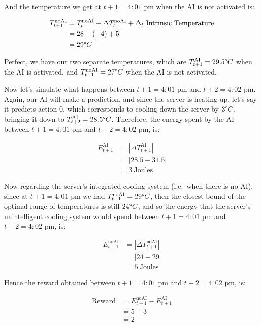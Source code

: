 \documentclass[]{book}
\begin{document}
And the temperature we get at \(t+1 = 4:01\) pm when the AI is not activated is:

\begin{align*}
    T_{t+1}^{\textrm{noAI}}
    & = T_t^{\textrm{noAI}} + \Delta T_t^{\textrm{noAI}} + \Delta_t \ \textrm{Intrinsic Temperature} \\
    & = 28 + (-4) + 5 \\
    & = 29 \degree C
\end{align*}

Perfect, we have our two separate temperatures, which are \(T_{t+1}^{\textrm{AI}} = 29.5 \degree C\) when the AI is activated, and \(T_{t+1}^{\textrm{noAI}} = 27 \degree C\) when the AI is not activated.

Now let's simulate what happens between \(t+1 = 4:01\) pm and \(t+2 = 4:02\) pm. Again, our AI will make a prediction, and since the server is heating up, let's say it predicts action 0, which corresponds to cooling down the server by \(3 \degree C\), bringing it down to \(T_{t+2}^{\textrm{AI}} = 28.5 \degree C\). Therefore, the energy spent by the AI between \(t+1 = 4:01\) pm and \(t+2 = 4:02\) pm, is:

\begin{align*}
    E_{t+1}^{\textrm{AI}}
    & = |\Delta T_{t+1}^{\textrm{AI}}| \\
    & = |28.5 - 31.5| \\
    & = 3 \ \textrm{Joules}
\end{align*}

Now regarding the server's integrated cooling system (i.e.~when there is no AI), since at \(t+1 = 4:01\) pm we had \(T_{t+1}^{\textrm{noAI}} = 29 \degree C\), then the closest bound of the optimal range of temperatures is still \(24 \degree C\), and so the energy that the server's unintelligent cooling system would spend between \(t+1 = 4:01\) pm and \(t+2 = 4:02\) pm, is:

\begin{align*}
    E_{t+1}^{\textrm{noAI}}
    & = |\Delta T_{t+1}^{\textrm{noAI}}| \\
    & = |24 - 29| \\
    & = 5 \ \textrm{Joules}
\end{align*}

Hence the reward obtained between \(t+1 = 4:01\) pm and \(t+2 = 4:02\) pm, is:

\begin{align*}
    \textrm{Reward}
    & = E_{t+1}^{\textrm{noAI}} - E_{t+1}^{\textrm{AI}} \\
    & = 5 - 3 \\
    & = 2
\end{align*}
\end{document}
